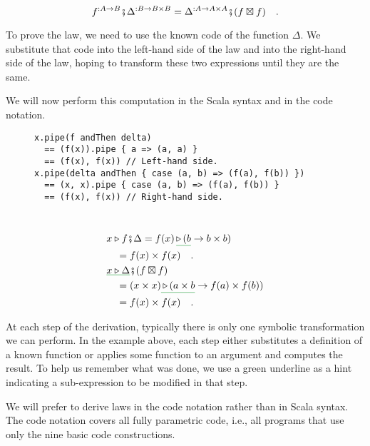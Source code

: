 ~\vspace{-0.3\baselineskip}
\[
f^{:A\rightarrow B}\bef\Delta^{:B\rightarrow B\times B}=\Delta^{:A\rightarrow A\times A}\bef(f\boxtimes f)\quad.
\]

\noindent To prove the law, we need to use the known code of the function
$\Delta$. We substitute that code into the left-hand side of the
law and into the right-hand side of the law, hoping to transform these
two expressions until they are the same.

We will now perform this computation in the Scala syntax and in the
code notation.

\begin{wrapfigure}{L}{0.54\columnwidth}%
\vspace{-0.6\baselineskip}
\begin{lstlisting}
x.pipe(f andThen delta)
  == (f(x)).pipe { a => (a, a) }
  == (f(x), f(x)) // Left-hand side.
x.pipe(delta andThen { case (a, b) => (f(a), f(b)) })
  == (x, x).pipe { case (a, b) => (f(a), f(b)) }
  == (f(x), f(x)) // Right-hand side.
\end{lstlisting}
\vspace{-3\baselineskip}
\end{wrapfigure}%

~\vspace{-1.4\baselineskip}
\begin{align*}
 & x\triangleright f\bef\Delta=f(x)\,\gunderline{\triangleright\,(b}\rightarrow b\times b)\\
 & \quad=f(x)\times f(x)\quad.\\
 & \gunderline{x\triangleright\Delta}\bef(f\boxtimes f)\\
 & \quad=(x\times x)\gunderline{\,\triangleright\,(a\times b}\rightarrow f(a)\times f(b))\\
 & \quad=f(x)\times f(x)\quad.
\end{align*}
\vspace{-1.5\baselineskip}

At each step of the derivation, typically there is only one symbolic
transformation we can perform. In the example above, each step either
substitutes a definition of a known function or applies some function
to an argument and computes the result. To help us remember what was
done, we use a green underline as a hint indicating a sub-expression
to be modified in that step. 

We will prefer to derive laws in the code notation rather than in
Scala syntax. The code notation covers all fully parametric code,
i.e., all programs that use only the nine basic code constructions.

